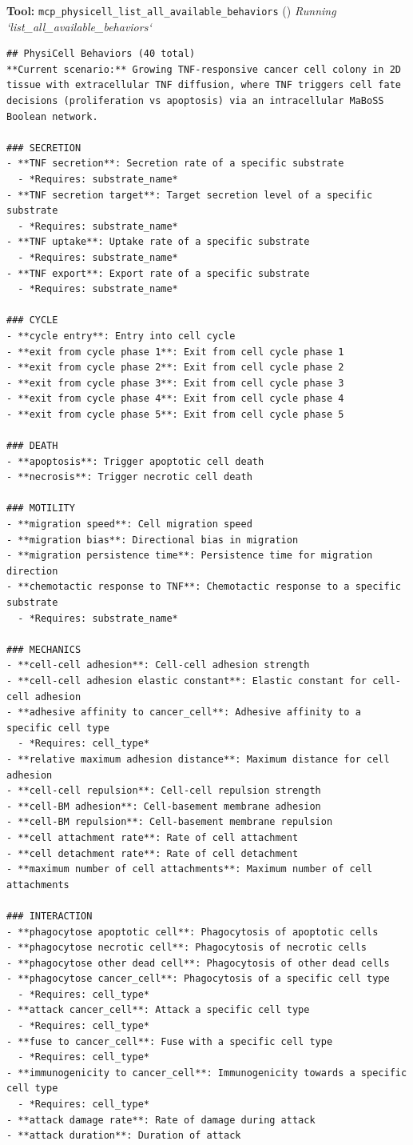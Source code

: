 \documentclass[11pt,a4paper]{article}
\begin{document}
\begin{toolokbox}
\textbf{Tool:} \texttt{mcp\_physicell\_list\_all\_available\_behaviors} (\checkmark)
\textit{Running `list\_all\_available\_behaviors`}
\begin{lstlisting}
## PhysiCell Behaviors (40 total)
**Current scenario:** Growing TNF-responsive cancer cell colony in 2D tissue with extracellular TNF diffusion, where TNF triggers cell fate decisions (proliferation vs apoptosis) via an intracellular MaBoSS Boolean network.

### SECRETION
- **TNF secretion**: Secretion rate of a specific substrate
  - *Requires: substrate_name*
- **TNF secretion target**: Target secretion level of a specific substrate
  - *Requires: substrate_name*
- **TNF uptake**: Uptake rate of a specific substrate
  - *Requires: substrate_name*
- **TNF export**: Export rate of a specific substrate
  - *Requires: substrate_name*

### CYCLE
- **cycle entry**: Entry into cell cycle
- **exit from cycle phase 1**: Exit from cell cycle phase 1
- **exit from cycle phase 2**: Exit from cell cycle phase 2
- **exit from cycle phase 3**: Exit from cell cycle phase 3
- **exit from cycle phase 4**: Exit from cell cycle phase 4
- **exit from cycle phase 5**: Exit from cell cycle phase 5

### DEATH
- **apoptosis**: Trigger apoptotic cell death
- **necrosis**: Trigger necrotic cell death

### MOTILITY
- **migration speed**: Cell migration speed
- **migration bias**: Directional bias in migration
- **migration persistence time**: Persistence time for migration direction
- **chemotactic response to TNF**: Chemotactic response to a specific substrate
  - *Requires: substrate_name*

### MECHANICS
- **cell-cell adhesion**: Cell-cell adhesion strength
- **cell-cell adhesion elastic constant**: Elastic constant for cell-cell adhesion
- **adhesive affinity to cancer_cell**: Adhesive affinity to a specific cell type
  - *Requires: cell_type*
- **relative maximum adhesion distance**: Maximum distance for cell adhesion
- **cell-cell repulsion**: Cell-cell repulsion strength
- **cell-BM adhesion**: Cell-basement membrane adhesion
- **cell-BM repulsion**: Cell-basement membrane repulsion
- **cell attachment rate**: Rate of cell attachment
- **cell detachment rate**: Rate of cell detachment
- **maximum number of cell attachments**: Maximum number of cell attachments

### INTERACTION
- **phagocytose apoptotic cell**: Phagocytosis of apoptotic cells
- **phagocytose necrotic cell**: Phagocytosis of necrotic cells
- **phagocytose other dead cell**: Phagocytosis of other dead cells
- **phagocytose cancer_cell**: Phagocytosis of a specific cell type
  - *Requires: cell_type*
- **attack cancer_cell**: Attack a specific cell type
  - *Requires: cell_type*
- **fuse to cancer_cell**: Fuse with a specific cell type
  - *Requires: cell_type*
- **immunogenicity to cancer_cell**: Immunogenicity towards a specific cell type
  - *Requires: cell_type*
- **attack damage rate**: Rate of damage during attack
- **attack duration**: Duration of attack


\end{lstlisting}
\end{toolokbox}
\end{document}
